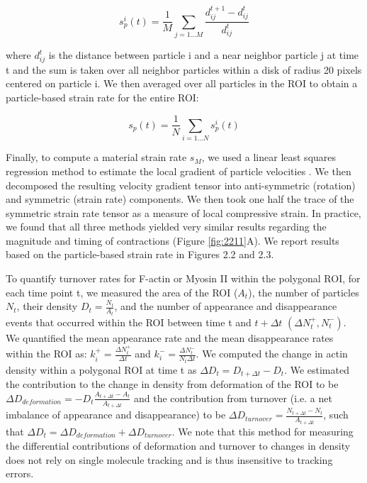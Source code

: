 $$ s_{p}^i(t) = \frac{1}{M} \sum_{j=1...M} \frac{d_{ij}^{t+1} - d_{ij}^{t}}{d_{ij}^{t}}$$

where $d_{ij}^{t}$ is the distance between particle i and a near neighbor particle j at time t and the sum is taken over all neighbor particles within a disk of radius 20 pixels centered on particle i. We then averaged over all particles in the ROI to obtain a particle-based strain rate for the entire ROI:

$$s_{p}(t) = \frac{1}{N} \sum_{i=1...N} s_{p}^i(t)$$

Finally, to compute a material strain rate $s_M$, we used a linear least squares regression method to estimate the local gradient of particle velocities \cite{Landau:1987uk}. We then decomposed the resulting velocity gradient tensor into anti-symmetric (rotation) and symmetric (strain rate) components. We then took one half the trace of the symmetric strain rate tensor as a measure of local compressive strain. In practice, we found that all three methods yielded very similar results regarding the magnitude and timing of contractions (Figure \ref{fig:2211}A).  We report results based on the particle-based strain rate in Figures 2.2 and 2.3.


To quantify turnover rates for F-actin or Myosin II within the polygonal ROI, for each time point t, we measured the area of the ROI ($A_{t}$), the number of particles $N_{t}$, their density $D_{t} = \frac{N_{t}}{A_{t}}$, and the number of appearance and disappearance events that occurred within the ROI between time t and $t+\Delta t$ $(\Delta N_{t}^+,N_{t}^-)$.  We quantified the mean appearance rate and the mean disappearance rates within the ROI as: $k_{i}^+ = \frac{\Delta N_{t}^+} {\Delta t}$ and $k_{i}^- = \frac{\Delta N_{t}^-} {N_{t}\Delta t}$.  We computed the change in actin density within a polygonal ROI at time t as $\Delta D_{t} = D_{t+\Delta t} - D_{t}$.  We estimated the contribution to the change in density from deformation of the ROI to be $\Delta D_{\textit{deformation}} = -D_{t}\frac{A_{t+\Delta t} - A_{t}}{A_{t+\Delta t}}$ and the contribution from turnover (i.e. a net imbalance of appearance and disappearance) to be $\Delta D_{\textit{turnover}} = \frac{N_{t+\Delta t} - N_{t} } {A_{t+\Delta t}}$, such that $\Delta D_{t} = \Delta D_{\textit{deformation}} + \Delta D_{\textit{turnover}}$.  We note that this method for measuring the differential contributions  of deformation and turnover to changes in density does not rely on single molecule tracking and is thus insensitive to tracking errors.



